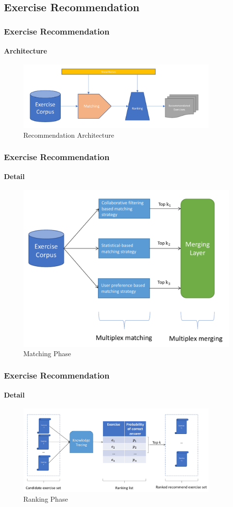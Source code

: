 \documentclass{beamer}
\begin{document}
\subsection{Exercise Recommendation}
\begin{frame}
  \frametitle{Exercise Recommendation}
  \framesubtitle{Architecture}
  \begin{figure}
    \includegraphics[width=0.9\textwidth]{figures/ch4-ov.pdf}
    \caption{Recommendation Architecture}
  \end{figure}
\end{frame}

\begin{frame}
  \frametitle{Exercise Recommendation}
  \framesubtitle{Detail}
  \begin{figure}
    \includegraphics[height=0.7\textheight]{figures/ch4-matching.pdf}
    \caption{Matching Phase}
  \end{figure}
\end{frame}

\begin{frame}
  \frametitle{Exercise Recommendation}
  \framesubtitle{Detail}
  \begin{figure}
    \includegraphics[width=0.9\textwidth]{figures/ch4-ranking.pdf}
    \caption{Ranking Phase}
  \end{figure}
\end{frame}
\end{document}

